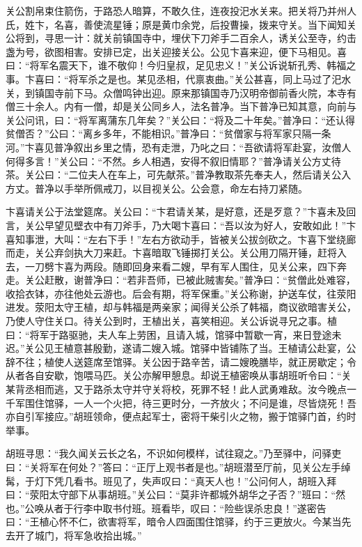 关公割帛束住箭伤，于路恐人暗算，不敢久住，连夜投汜水关来。把关将乃并州人氏，姓卞，名喜，善使流星锤；原是黄巾余党，后投曹操，拨来守关。当下闻知关公将到，寻思一计：就关前镇国寺中，埋伏下刀斧手二百余人，诱关公至寺，约击盏为号，欲图相害。安排已定，出关迎接关公。公见卞喜来迎，便下马相见。喜曰：“将军名震天下，谁不敬仰！今归皇叔，足见忠义！”关公诉说斩孔秀、韩福之事。卞喜曰：“将军杀之是也。某见丞相，代禀衷曲。”关公甚喜，同上马过了汜水关，到镇国寺前下马。众僧鸣钟出迎。原来那镇国寺乃汉明帝御前香火院，本寺有僧三十余人。内有一僧，却是关公同乡人，法名普净。当下普净已知其意，向前与关公问讯，曰：“将军离蒲东几年矣？”关公曰：“将及二十年矣。”普净曰：“还认得贫僧否？”公曰：“离乡多年，不能相识。”普净曰：“贫僧家与将军家只隔一条河。”卞喜见普净叙出乡里之情，恐有走泄，乃叱之曰：“吾欲请将军赴宴，汝僧人何得多言！”关公曰：“不然。乡人相遇，安得不叙旧情耶？”普净请关公方丈待茶。关公曰：“二位夫人在车上，可先献茶。”普净教取茶先奉夫人，然后请关公入方丈。普净以手举所佩戒刀，以目视关公。公会意，命左右持刀紧随。

卞喜请关公于法堂筵席。关公曰：“卞君请关某，是好意，还是歹意？”卞喜未及回言，关公早望见壁衣中有刀斧手，乃大喝卞喜曰：“吾以汝为好人，安敢如此！”卞喜知事泄，大叫：“左右下手！”左右方欲动手，皆被关公拔剑砍之。卞喜下堂绕廊而走，关公弃剑执大刀来赶。卞喜暗取飞锤掷打关公。关公用刀隔开锤，赶将入去，一刀劈卞喜为两段。随即回身来看二嫂，早有军人围住，见关公来，四下奔走。关公赶散，谢普净曰：“若非吾师，已被此贼害矣。”普净曰：“贫僧此处难容，收拾衣钵，亦往他处云游也。后会有期，将军保重。”关公称谢，护送车仗，往荥阳进发。荥阳太守王植，却与韩福是两亲家；闻得关公杀了韩福，商议欲暗害关公，乃使人守住关口。待关公到时，王植出关，喜笑相迎。关公诉说寻兄之事。植曰：“将军于路驱驰，夫人车上劳困，且请入城，馆驿中暂歇一宵，来日登途未迟。”关公见王植意甚殷勤，遂请二嫂入城。馆驿中皆铺陈了当。王植请公赴宴，公辞不往；植使人送筵席至馆驿。关公因于路辛苦，请二嫂晚膳毕，就正房歇定；令从者各自安歇，饱喂马匹。关公亦解甲憩息。却说王植密唤从事胡班听令曰：“关某背丞相而逃，又于路杀太守并守关将校，死罪不轻！此人武勇难敌。汝今晚点一千军围住馆驿，一人一个火把，待三更时分，一齐放火；不问是谁，尽皆烧死！吾亦自引军接应。”胡班领命，便点起军士，密将干柴引火之物，搬于馆驿门首，约时举事。

胡班寻思：“我久闻关云长之名，不识如何模样，试往窥之。”乃至驿中，问驿吏曰：“关将军在何处？”答曰：“正厅上观书者是也。”胡班潜至厅前，见关公左手绰髯，于灯下凭几看书。班见了，失声叹曰：“真天人也！”公问何人，胡班入拜曰：“荥阳太守部下从事胡班。”关公曰：“莫非许都城外胡华之子否？”班曰：“然也。”公唤从者于行李中取书付班。班看毕，叹曰：“险些误杀忠良！”遂密告曰：“王植心怀不仁，欲害将军，暗令人四面围住馆驿，约于三更放火。今某当先去开了城门，将军急收拾出城。”

